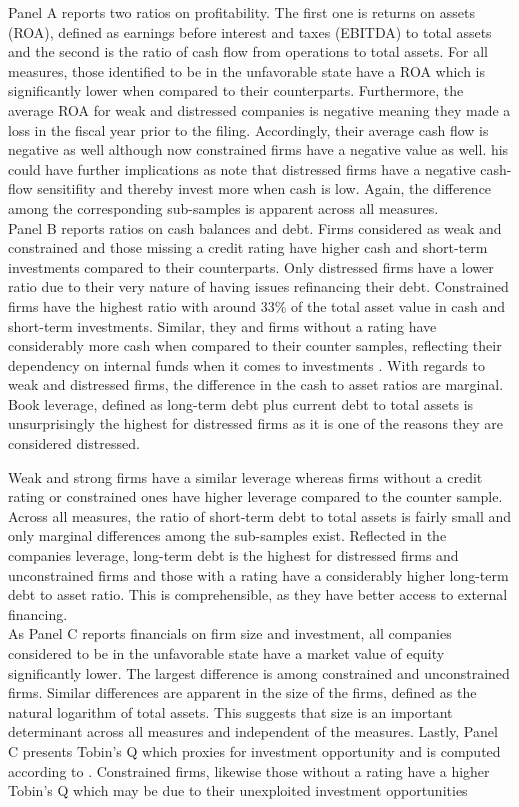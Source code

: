 \documentclass[12pt]{article}
\begin{document}
Panel A reports two ratios on profitability. The first one is returns on assets (ROA), defined as earnings before interest and taxes (EBITDA) to total assets and the second is the ratio of cash flow from operations to total assets. 
For all measures, those identified to be in the unfavorable state have a ROA which is significantly lower when compared to their counterparts. Furthermore, the average ROA for weak and distressed companies is negative meaning they made a loss in the fiscal year prior to the filing. Accordingly, their average cash flow is negative as well although now constrained firms have a negative value as well. his could have further implications as \citet{Bhagat2005} note that distressed firms have a negative cash-flow sensitifity and thereby invest more when cash is low. Again, the difference among the corresponding sub-samples is apparent across all measures.\\
Panel B reports ratios on cash balances and debt. Firms considered as weak and constrained and those missing a credit rating have higher cash and short-term investments compared to their counterparts. Only distressed firms have a lower ratio due to their very nature of having issues refinancing their debt. Constrained firms have the highest ratio with around 33\% of the total asset value in cash and short-term investments. Similar, they and firms without a rating have considerably more cash when compared to their counter samples, reflecting their dependency on internal funds when it comes to investments \citep{arg}. With regards to weak and distressed firms, the difference in the cash to asset ratios are marginal. 
Book leverage, defined as long-term debt plus current debt to total assets \citep[p.1440]{MacKay2005} is unsurprisingly the highest for distressed firms as it is one of the reasons they are considered distressed. 

Weak and strong firms have a similar leverage whereas firms without a credit rating or constrained ones have higher leverage compared to the counter sample. Across all measures, the ratio of short-term debt to total assets is fairly small and only marginal differences among the sub-samples exist. 
Reflected in the companies leverage, long-term debt is the highest for distressed firms and unconstrained firms and those with a rating have a considerably higher long-term debt to asset ratio. This is comprehensible, as they have better access to external financing.\\
As Panel C reports financials on firm size and investment, all companies considered to be in the unfavorable state have a market value of equity significantly lower. The largest difference is among constrained and unconstrained firms. Similar differences are apparent in the size of the firms, defined as the natural logarithm of total assets. This suggests that size is an important determinant across all measures and independent of the measures. Lastly, Panel C presents Tobin's Q which proxies for investment opportunity \citep[p.1441]{MacKay2005} and is computed according to \citet[p.1]{Khatami2014}. Constrained firms, likewise those without a rating have a higher Tobin's Q which may be due to their unexploited investment opportunities \citep{Whited2006}
\end{document}
